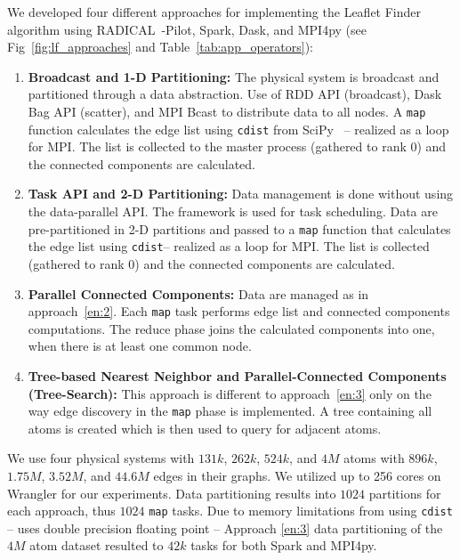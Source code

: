 We developed four different approaches for implementing the Leaflet Finder algorithm using RADICAL~-Pilot, Spark, Dask, and MPI4py (see Fig~\ref{fig:lf_approaches} and Table~\ref{tab:app_operators}):
\begin{enumerate}[1)]
    \item \textbf{Broadcast and 1-D Partitioning:}
    The physical system is broadcast and partitioned through a data abstraction.
    Use of RDD API (broadcast), Dask Bag API (scatter), and MPI Bcast to distribute data to all nodes.
    A \texttt{map} function calculates the edge list using \texttt{cdist} from SciPy~\cite{scipy} -- realized as a loop for MPI.
    The list is collected to the master process (gathered to rank 0) and the connected components are calculated.\label{en:1}
    \item \textbf{Task API and 2-D Partitioning:}
    Data management is done without using the data-parallel API.
    The framework is used for task scheduling.
    Data are pre-partitioned in 2-D partitions and passed to a \texttt{map} function that calculates the edge list using \texttt{cdist}-- realized as a loop for MPI.
    The list is collected (gathered to rank 0) and the connected components are calculated.\label{en:2}
    \item \textbf{Parallel Connected Components:}
    Data are managed as in approach~\ref{en:2}.
    Each \texttt{map} task performs edge list and connected components computations.
    The reduce phase joins the calculated components into one, when there is at least one common node.\label{en:3}
    \item \textbf{Tree-based Nearest Neighbor and Parallel-Connected Components (Tree-Search):}
    This approach is different to approach~\ref{en:3} only on the way edge discovery in the \texttt{map} phase is implemented.
    A tree containing all atoms is created which is then used to query for adjacent atoms.\label{en:4}
\end{enumerate}

We use four physical systems with $131k$, $262k$, $524k$, and $4M$ atoms with $896k$, $1.75M$, $3.52M$, and $44.6M$ edges in their graphs.
We utilized up to 256 cores on Wrangler for our experiments.
Data partitioning results into $1024$ partitions for each approach, thus $1024$ \texttt{map} tasks.
Due to memory limitations from using \texttt{cdist} -- uses double precision floating point -- Approach \ref{en:3} data partitioning of the $4M$ atom dataset resulted to $42k$ tasks for both Spark and MPI4py.


